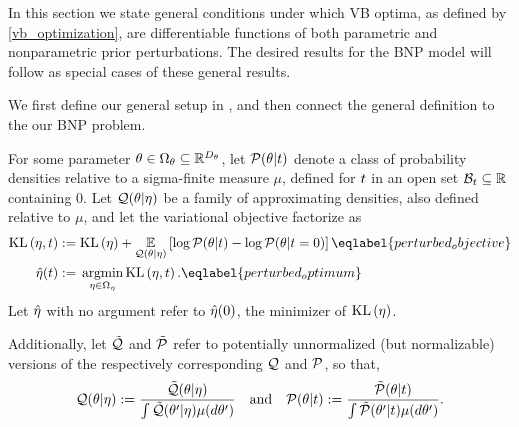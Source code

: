 In this section we state general conditions under which VB optima, as defined by
\eqref{vb_optimization}, are differentiable functions of both parametric and
nonparametric prior perturbations.  The desired results for the BNP model will
follow as special cases of these general results.

We first define our general setup in , and then connect
the general definition to the our BNP problem.

\begin{defn}
%
For some parameter $\theta \in \Omega_{\theta} \subseteq \mathbb{R}^{{D_{\theta}}}$, let
$\mathcal{P}(\theta \vert t)$ denote a class of probability densities relative to
a sigma-finite measure $\mu$, defined for $t$ in an open set $\mathcal{B}_t
\subseteq \mathbb{R}$ containing $0$.  Let $\mathcal{Q}(\theta \vert \eta)$ be a
family of approximating densities, also defined relative to $\mu$, and let
the variational objective factorize as
%
\begin{align}
%
\KL{\eta, \t} :={}& \KL{\eta} +
    \expect{\q(\theta \vert \eta)}
           {\log \p(\theta \vert \t) - \log \p(\theta \vert \t=0)}
           \eqlabel{perturbed_objective}\\
\etaopt(\t) :={}& \argmin_{\eta \in \etadom} \KL{\eta, \t}.
    \eqlabel{perturbed_optimum}
%
\end{align}
%
Let $\hat\eta$ with no argument refer to $\hat\eta(0)$, the minimizer
of $\mathrm{KL}\left(\eta\right)$.
%
\end{defn}

Additionally, let $\tilde{\mathcal{Q}}$ and $\tilde{\mathcal{P}}$ refer to potentially unnormalized (but
normalizable) versions of the respectively corresponding $\mathcal{Q}$ and $\mathcal{P}$, so that,
%
\begin{align*}
%
\q(\theta \vert \eta) :={}
    \frac{\qtil(\theta \vert \eta)}
    {\int \qtil(\theta' \vert \eta) \mu(d\theta')} \mathand
\p(\theta \vert \t) :={}
    \frac{\ptil(\theta \vert \t)}
    {\int \ptil(\theta' \vert \t) \mu(d\theta')}.
%
\end{align*}


